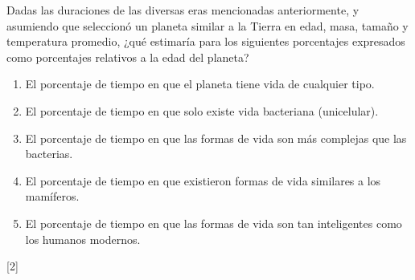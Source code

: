 \documentclass[a4paper]{article}
\newcounter{problema}
\begin{document}
\begin{problema}
Dadas las duraciones de las diversas eras mencionadas anteriormente, y asumiendo que seleccionó un planeta similar a la Tierra en edad, masa, tamaño y temperatura promedio, ¿qué estimaría para los siguientes porcentajes expresados como porcentajes relativos a la edad del planeta?

\vspace{5mm}
\begin{enumerate}
	\item El porcentaje de tiempo en que el planeta tiene vida de cualquier tipo.
	\item El porcentaje de tiempo en que solo existe vida bacteriana (unicelular).
	\item El porcentaje de tiempo en que las formas de vida son más complejas que las bacterias.
	\item El porcentaje de tiempo en que existieron formas de vida similares a los mamíferos.
	\item El porcentaje de tiempo en que las formas de vida son tan inteligentes como los humanos modernos.
\end{enumerate}

\end{problema}
[2]  \cite{NASA_AstrobiologyMath}
\end{document}
